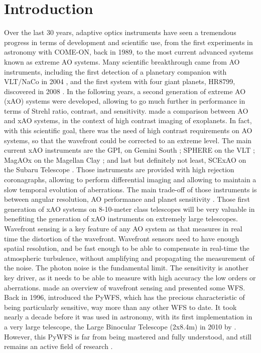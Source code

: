 \documentclass[twocolumn]{aastex62}
\begin{document}


\section{Introduction} \label{sec:intro}

Over the last 30 years, adaptive optics instruments have seen a tremendous progress in terms of development and scientific use, from the first experiments in astronomy with COME-ON, back in 1989, to the most current advanced systems known as extreme AO systems. Many scientific breakthrough came from AO instruments, including the first detection of a planetary companion with VLT/NaCo in 2004 \citep{chauvin2004}, and the first system with four giant planets, HR8799, discovered in 2008 \citep{Marois2008}. In the following years, a second generation of extreme AO (xAO) systems were developed, allowing to go much further in performance in terms of Strehl ratio, contrast, and sensitivity. \cite{Milli2016} made a comparison between AO and xAO systems, in the context of high contrast imaging of exoplanets. In fact, with this scientific goal, there was the need of high contrast requirements on AO systems, so that the wavefront could be corrected to an extreme level. The main current xAO instruments are the GPI, on Gemini South \citep{GPIMacintosh2014,GPIMacintosh2018}; SPHERE on the VLT \citep{BeuzitSPHERE2008}; MagAOx on the Magellan Clay \citep{Males2018MagAOx}; and last but definitely not least, SCExAO on the Subaru Telescope \citep{GuyonSCExAO2010}. 
Those instruments are provided with high rejection coronagraphs, allowing to perform differential imaging and allowing to maintain a slow temporal evolution of aberrations. The main trade-off of those instruments is between angular resolution, AO performance and planet sensitivity \citep{Milli2016}.
Those first generation of xAO systems on 8-10-meter class telescopes will be very valuable in benefiting the generation of xAO instruments on extremely large telescopes.\\

Wavefront sensing is a key feature of any AO system as that measures in real time the distortion of the wavefront. Wavefront sensors need to have enough spatial resolution, and be fast enough to be able to compensate in real-time the atmospheric turbulence, without amplifying and propagating the measurement of the noise. The photon noise is the fundamental limit. The sensitivity is another key driver, as it needs to be able to measure with high accuracy the low orders or aberrations. \cite{Rousset1999} made an overview of wavefront sensing and presented some WFS. 
Back in 1996, \cite{Ragazzoni1996} introduced the PyWFS, which has the precious characteristic of being particularly sensitive, way more than any other WFS to date. 
It took nearly a decade before it was used in astronomy, with its first implementation in a very large telescope, the Large Binocular Telescope (2x8.4m) in 2010 by \cite{Esposito2010LBT}. 
However, this PyWFS is far from being mastered and fully understood, and still remains an active field of research \citep{Deo2019gain, Chambouleyron2020}.
\end{document}
